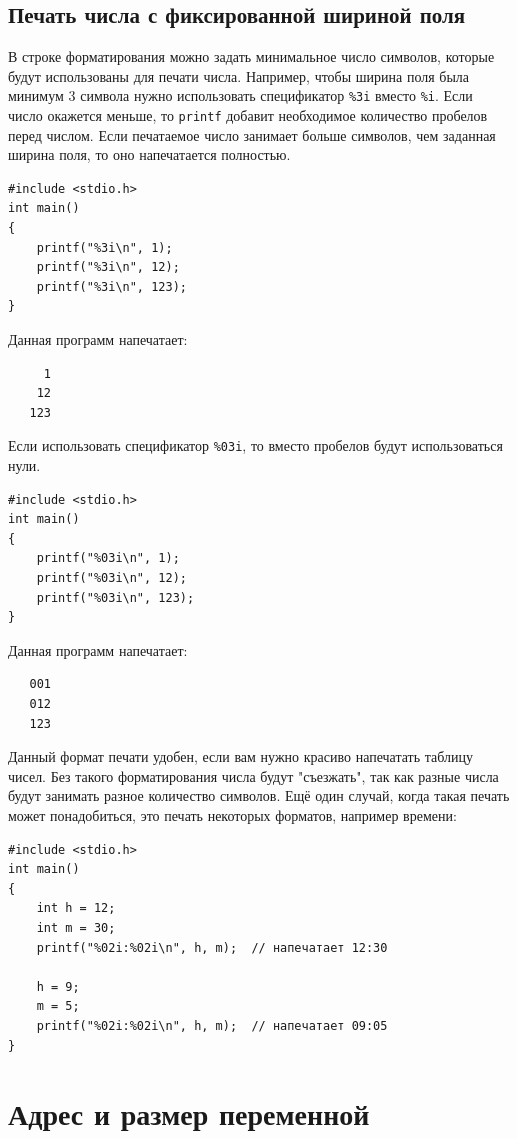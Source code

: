 \documentclass{article}
\begin{document}
\subsection*{Печать числа с фиксированной шириной поля}
В строке форматирования можно задать минимальное число символов, которые будут использованы для печати числа. Например, чтобы ширина поля была минимум 3 символа нужно использовать спецификатор \texttt{\%3i} вместо \texttt{\%i}.
Если число окажется меньше, то \texttt{printf} добавит необходимое количество пробелов перед числом. Если печатаемое число занимает больше символов, чем заданная ширина поля, то оно напечатается полностью.
\begin{lstlisting}
#include <stdio.h>
int main()
{
    printf("%3i\n", 1);
    printf("%3i\n", 12);
    printf("%3i\n", 123);
}
\end{lstlisting}
Данная программ напечатает:
\begin{verbatim}
     1
    12
   123
\end{verbatim}
Если использовать спецификатор \texttt{\%03i}, то вместо пробелов будут использоваться нули.
\begin{lstlisting}
#include <stdio.h>
int main()
{
    printf("%03i\n", 1);
    printf("%03i\n", 12);
    printf("%03i\n", 123);
}
\end{lstlisting}
Данная программ напечатает:
\begin{verbatim}
   001
   012
   123
\end{verbatim}
Данный формат печати удобен, если вам нужно красиво напечатать таблицу чисел. Без такого форматирования числа будут "съезжать"{}, так как разные числа будут занимать разное количество символов. Ещё один случай, когда такая печать может понадобиться, это печать некоторых форматов, например времени:
\begin{lstlisting}
#include <stdio.h>
int main()
{
	int h = 12;
	int m = 30;
	printf("%02i:%02i\n", h, m);  // напечатает 12:30
	
	h = 9;
	m = 5;
	printf("%02i:%02i\n", h, m);  // напечатает 09:05
}
\end{lstlisting}


\newpage
\section*{Адрес и размер переменной}
\end{document}
